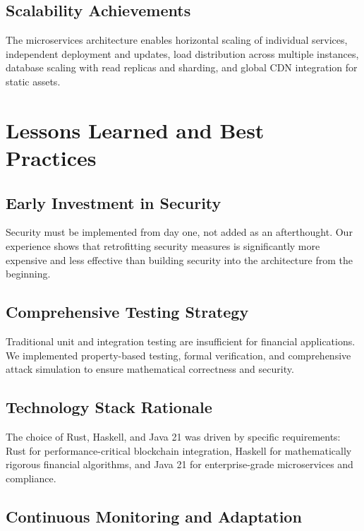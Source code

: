 \documentclass[11pt,a4paper]{article}
\begin{document}
\subsection{Scalability Achievements}

The microservices architecture enables horizontal scaling of individual services, independent deployment and updates, load distribution across multiple instances, database scaling with read replicas and sharding, and global CDN integration for static assets.

\section{Lessons Learned and Best Practices}

\subsection{Early Investment in Security}

Security must be implemented from day one, not added as an afterthought. Our experience shows that retrofitting security measures is significantly more expensive and less effective than building security into the architecture from the beginning.

\subsection{Comprehensive Testing Strategy}

Traditional unit and integration testing are insufficient for financial applications. We implemented property-based testing, formal verification, and comprehensive attack simulation to ensure mathematical correctness and security.

\subsection{Technology Stack Rationale}

The choice of Rust, Haskell, and Java 21 was driven by specific requirements: Rust for performance-critical blockchain integration, Haskell for mathematically rigorous financial algorithms, and Java 21 for enterprise-grade microservices and compliance.

\subsection{Continuous Monitoring and Adaptation}
\end{document}
